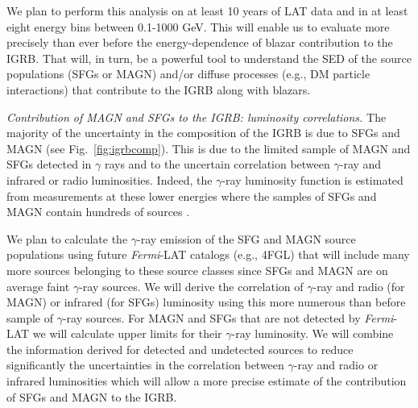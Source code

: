 \documentclass[12 pt]{article}
\begin{document}
We plan to perform this analysis on at least 10 years of LAT data and in at least eight energy bins between 0.1-1000 GeV. This will enable us to evaluate more precisely than ever before the energy-dependence of blazar contribution to the IGRB.  That will, in turn, be a powerful tool to understand the SED of the source populations (SFGs or MAGN) and/or diffuse processes (e.g., DM particle interactions) that contribute to the IGRB along with blazars.









{\it Contribution of MAGN and SFGs to the IGRB: luminosity correlations.}
The majority of the uncertainty in the composition of the IGRB is due to SFGs and MAGN \cite{DiMauro:2015tfa} (see Fig.~\ref{fig:igrbcomp}). 
This is due to the limited sample of MAGN and SFGs detected in $\gamma$ rays and to the uncertain correlation between $\gamma$-ray and infrared or radio luminosities.
Indeed, the $\gamma$-ray luminosity function is estimated from measurements at these lower energies where the samples of SFGs and MAGN contain hundreds of sources \cite{2012ApJ...755..164A,DiMauro:2013xta}.


We plan to calculate the $\gamma$-ray emission of the SFG and MAGN source populations using future {\it Fermi}-LAT catalogs (e.g., 4FGL) that will include many more sources belonging to these source classes since SFGs and MAGN are on average faint $\gamma$-ray sources.
We will derive the correlation of $\gamma$-ray and radio (for MAGN) or infrared (for SFGs) luminosity using this more numerous than before sample of $\gamma$-ray sources.
For MAGN and SFGs that are not detected by {\it Fermi}-LAT we will calculate upper limits for their $\gamma$-ray luminosity.
We will combine the information derived for detected and undetected sources to reduce significantly the uncertainties in the correlation between $\gamma$-ray and radio or infrared luminosities which will allow a more precise estimate of the contribution of SFGs and MAGN to the IGRB.
\end{document}
